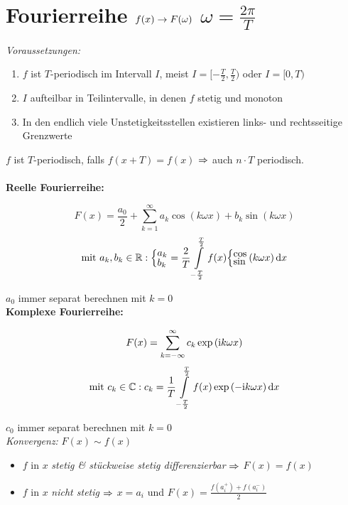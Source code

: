 \documentclass[german,color,5pt]{latex4ei/latex4ei_fs}
\begin{document}
\section{Fourierreihe $f(x) \rightarrow F(\omega)$ \qquad $\omega = \frac{2 \pi}{T}$}
\begin{sectionbox}
	\emph{Voraussetzungen:}
	\begin{enumerate}
		\item $f$ ist $T$-periodisch im Intervall $I$, meist $I=[-\frac{T}{2},\frac{T}{2})$ oder $I=[0,T)$
		\item $I$ aufteilbar in Teilintervalle, in denen $f$ stetig und monoton
		\item In den endlich viele Unstetigkeitsstellen existieren links- und rechtsseitige Grenzwerte
	\end{enumerate}
	$f$ ist $T$-periodisch, falls $f(x+T) = f(x)$ $\Rightarrow$ auch $n \cdot T$ periodisch.\\\\
	\textbf{Reelle Fourierreihe:}
	\begin{emphbox}\vspace{-5pt}
		\[F(x) = \frac{a_0}{2} + \sum\limits_{k=1}^\infty a_k \cos \left(k \omega x \right) + b_k \sin \left( k \omega x \right)\]
		\[\text{mit } a_k,b_k \in \R:\Big\{ { ^{\textstyle a_k}_{\textstyle b_k}} = \frac{2}{T} \int\limits_{-\frac{T}{2}}^{\frac{T}{2}} f(x) \Big\{ {}^{\textstyle \cos} _{\textstyle \sin} \left(k \omega x \right) \diff x\]
	\end{emphbox}
	$a_0$ immer separat berechnen mit $k=0$\\
	\textbf{Komplexe Fourierreihe:}
	\begin{emphbox}\vspace{-5pt}
		\[F(x) = \sum\limits_{k=-\infty}^\infty c_k \exp \left( \mathrm{i} k \omega x \right)\]
		\[\text{mit } c_k \in \C: c_k = \frac{1}{T} \int\limits_{-\frac{T}{2}}^{\frac{T}{2}} f(x) \exp \left( - \i k \omega x \right) \diff x\]
	\end{emphbox}	
	$c_0$ immer separat berechnen mit $k=0$\\
	\emph{Konvergenz:} $F(x) \sim f(x)$
	\begin{itemize}
		\item $f$ in $x$ \emph{stetig \& stückweise stetig differenzierbar} $\Rightarrow$ $F(x) = f(x)$
		\item $f$ in $x$ \emph{nicht stetig} $\Rightarrow$ $x = a_i$ und $F(x) = \frac{f(a_i^+) + f(a_i^-)}{2}$
	\end{itemize}
\end{sectionbox}
\end{document}
